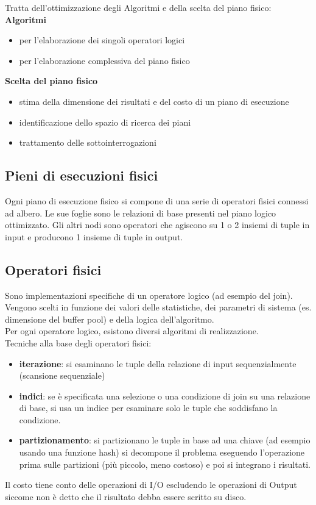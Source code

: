 Tratta dell'ottimizzazione degli Algoritmi e della scelta del piano fisico:\\
\textbf{Algoritmi}
\begin{itemize}
    \item per l’elaborazione dei singoli operatori logici
    \item per l’elaborazione complessiva del piano fisico
\end{itemize}
\textbf{Scelta del piano fisico}
\begin{itemize}
    \item stima della dimensione dei risultati e del costo di un piano di esecuzione
    \item identificazione dello spazio di ricerca dei piani
    \item trattamento delle sottointerrogazioni
\end{itemize}

\subsection{Pieni di esecuzioni fisici}
Ogni piano di esecuzione fisico si compone di una serie di operatori fisici connessi ad albero. Le sue foglie sono le relazioni di base presenti nel piano logico ottimizzato. Gli altri nodi sono operatori che agiscono su 1 o 2 insiemi di tuple in input e producono 1 insieme di tuple in output.

\subsection{Operatori fisici}
Sono implementazioni specifiche di un operatore logico (ad esempio del join).\\
Vengono scelti in funzione dei valori delle statistiche, dei parametri di sistema (es. dimensione del buffer pool) e della logica dell'algoritmo.\\
Per ogni operatore logico, esistono diversi algoritmi di realizzazione.\\
Tecniche alla base degli operatori fisici:
\begin{itemize}
    \item \textbf{iterazione}: si esaminano le tuple della relazione di input sequenzialmente (scansione sequenziale)
    \item \textbf{indici}: se è specificata una selezione o una condizione di join su una relazione di base, si usa un indice per esaminare solo le tuple che soddisfano la condizione.
    \item \textbf{partizionamento}: si partizionano le tuple in base ad una chiave (ad esempio usando una funzione hash) si decompone il problema eseguendo l’operazione prima sulle partizioni (più piccolo, meno costoso) e poi si integrano i risultati.
\end{itemize}
Il costo tiene conto delle operazioni di I/O escludendo le operazioni di Output siccome non \`e detto che il risultato debba essere scritto su disco.

